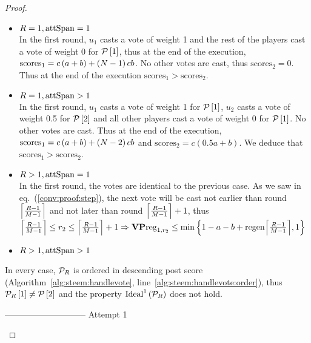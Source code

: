 \begin{proof}
\begin{itemize}
    \begin{itemize}
      \item $\rounds = 1, \attspan = 1$ \\
      In the first round, $u_1$ casts a vote of weight 1 and the rest of the
      players cast a vote of weight 0 for $\postlist\left[1\right]$, thus at the
      end of the execution, $\mathrm{scores}_1 = c \left(a + b\right) +
      \left(\playerlen - 1\right) c b$. No other votes are cast, thus
      $\mathrm{scores}_2 = 0$. Thus at the end of the execution
      $\mathrm{scores}_1 > \mathrm{scores}_2$.

      \item $\rounds = 1, \attspan > 1$ \\
      In the first round, $u_1$ casts a vote of weight 1 for
      $\postlist\left[1\right]$, $u_2$ casts a vote of weight 0.5 for
      $\postlist\left[2\right]$ and all other players cast a vote of weight 0
      for $\postlist\left[1\right]$. No other votes are cast. Thus at the end of
      the execution, $\mathrm{scores}_1 = c\left(a + b\right) + \left(\playerlen
      - 2\right) c b$ and $\mathrm{scores}_2 = c\left(0.5a + b\right)$. We
      deduce that $\mathrm{scores}_1 > \mathrm{scores}_2$.

      \item $\rounds > 1, \attspan = 1$ \\
      In the first round, the votes are identical to the previous case. As we
      saw in eq.~(\ref{conv:proof:step}), the next vote will be cast not earlier
      than round $\ceil*{\frac{\rounds - 1}{\postlen - 1}}$ and not later than
      round $\ceil*{\frac{\rounds - 1}{\postlen - 1}} + 1$, thus
      $\ceil*{\frac{\rounds - 1}{\postlen - 1}} \leq \round_2 \leq
      \ceil*{\frac{\rounds - 1}{\postlen - 1}} + 1 \Rightarrow \votpowvecreg_{1,
      \round_2} \leq \min{\left\{1 - a - b + \regen\ceil*{\frac{\rounds -
      1}{\postlen - 1}}, 1\right\}}$

      \item $\rounds > 1, \attspan > 1$ \\
    \end{itemize}
    In every case, $\postlist_\rounds$ is ordered in descending post score
    (Algorithm~\ref{alg:steem:handlevote},
    line~\ref{alg:steem:handlevote:order}), thus
    $\postlist_\rounds\left[1\right] \neq \postlist\left[2\right]$ and the
    property $\mathrm{Ideal}^1\left(\postlist_\rounds\right)$ does not hold.

    ----------------------------- Attempt 1


\end{itemize}
\end{proof}

